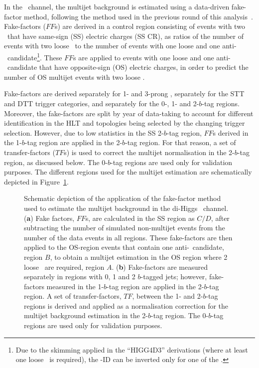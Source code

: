 In the \hadhad\ channel, the multijet background is estimated using a data-driven fake-factor method, following the method used in the previous round of this analysis~\cite{HIGG-2016-16}. Fake-factors ($FF$s) are derived in a control region consisting of events with two \tauhadvis\ that have same-sign (SS) electric charges (SS CR), as ratios of the number of events with two loose \tauhad\ to the number of events with one loose and one anti-\tauhad\ candidate\footnote{Due to the skimming applied in the ``HIGG4D3'' derivations (where at least one loose \tauhad\ is required), the \tauhad-ID can be inverted only for one of the \tauhad.}. These $FF$s are applied to events with one loose and one anti-\tauhad\ candidate that have opposite-sign (OS) electric charges, in order to predict the number of OS multijet events with two loose \tauhad.

Fake-factors are derived separately for 1- and 3-prong \tauhad, separately for
the STT and DTT trigger categories, and separately for the 0-, 1- and 2-$b$-tag
regions. Moreover, the fake-factors are split by year of data-taking to account
for different \tauhad identification in the HLT and topologies being selected by
the changing trigger selection. However, due to low statistics in the SS
2-$b$-tag region, $FF$s derived in the 1-$b$-tag region are applied in the
2-$b$-tag region. For that reason, a set of transfer-factors ($TF$s) is used to
correct the multijet normalisation in the 2-$b$-tag region, as discussed below. 
The 0-$b$-tag regions are used only for validation purposes. 
The different regions used for the multijet estimation are schematically
depicted in Figure~\ref{fig:hadhadABCDMethod}. 


\begin{figure}[!h]
\centering
\captionsetup[subfigure]{justification=centering}
        \caption{Schematic depiction of the application of the fake-factor method used to estimate the multijet background in the di-Higgs \hadhad\ channel. (\textbf{a}) Fake factors, $FF$s, are calculated in the SS region as $C/D$, after subtracting the number of simulated non-multijet events from the number of the data events in all regions. These fake-factors are then applied to the OS-region events that contain one anti-\tauhad\ candidate, region $B$, to obtain a multijet estimation in the OS region where 2 loose \tauhad\ are required, region $A$. (\textbf{b}) Fake-factors are measured separately in regions with 0, 1 and 2 $b$-tagged jets; however, fake-factors measured in the 1-$b$-tag region are applied in the 2-$b$-tag region. A set of transfer-factors, $TF$, between the 1- and 2-$b$-tag regions is derived and applied as a normalisation correction for the multijet background estimation in the 2-$b$-tag region. The 0-$b$-tag regions are used only for validation purposes.}
        \label{fig:hadhadABCDMethod}
    \end{figure}
    
